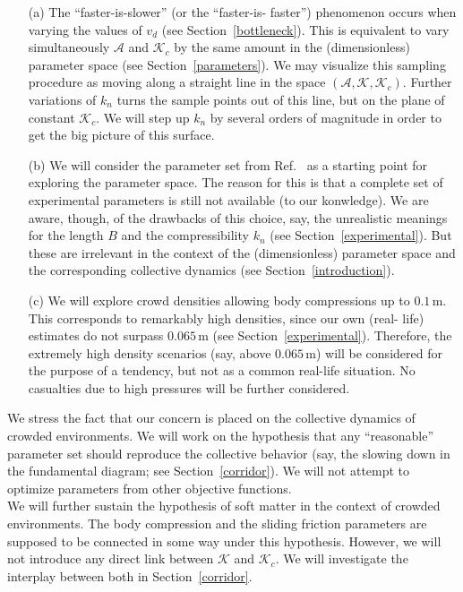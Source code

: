 \documentclass[preprint,12pt]{elsarticle}
\begin{document}
\begin{itemize}  \item[(a)] The ``faster-is-slower'' (or the ``faster-is-
faster'') phenomenon  occurs when varying the values of $v_d$ (see
Section~\ref{bottleneck}). This is  equivalent to vary simultaneously
$\mathcal{A}$ and $\mathcal{K}_c$ by the same  amount in the (dimensionless)
parameter space (see Section~\ref{parameters}). We  may visualize this sampling
procedure as moving along a straight line in the  space
$(\mathcal{A},\mathcal{K},\mathcal{K}_c)$. Further variations of  $k_n$ turns
the sample points out of this line, but on the plane of constant
$\mathcal{K}_c$. We will step up $k_n$ by several orders of magnitude in order
to get the big picture of this surface.

\item[(b)] We will consider the parameter set from Ref.~\cite{helbing_2000}  as
a starting point for exploring the parameter space. The reason for this is  that
a complete set of experimental parameters is still not available (to our
konwledge). We are aware, though, of the drawbacks of this choice, say, the
unrealistic meanings for the length $B$ and the compressibility $k_n$ (see
Section~\ref{experimental}). But these are irrelevant in the context of the
(dimensionless) parameter space and the corresponding collective dynamics (see
Section~\ref{introduction}).

\item[(c)] We will explore crowd densities allowing body compressions up to
$0.1\,$m. This corresponds to remarkably high densities, since our own  (real-
life) estimates do not surpass $0.065\,$m (see  Section~\ref{experimental}).
Therefore, the extremely high density  scenarios (say, above $0.065\,$m) will be
considered for the purpose of a  tendency, but not as a common real-life
situation. No casualties due to high  pressures will be further considered.

\end{itemize}

We stress the fact that our concern is placed on the collective dynamics of
crowded environments. We will work on the hypothesis that any ``reasonable''
parameter set should reproduce the collective behavior (say, the slowing down
in the fundamental diagram; see Section~\ref{corridor}). We will not attempt to
optimize parameters from other objective functions. \\

We will further sustain the hypothesis of soft matter in the context of crowded
environments. The body compression and the sliding friction parameters are
supposed to be connected in some way under this hypothesis. However, we will
not introduce any direct link between $\mathcal{K}$ and $\mathcal{K}_c$. We
will investigate the interplay between both in Section~\ref{corridor}.  \\
\end{document}
